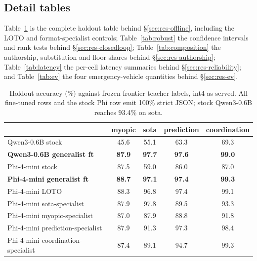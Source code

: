 
\subsection{Detail tables}\label{app:detail-tables}
Table~\ref{tab:offline-full} is the complete holdout table behind
\S\ref{sec:res-offline}, including the LOTO and format-specialist
controls; Table~\ref{tab:robust} the confidence intervals and rank tests
behind \S\ref{sec:res-closedloop}; Table~\ref{tab:composition} the
authorship, substitution and floor shares behind
\S\ref{sec:res-authorship}; Table~\ref{tab:latency} the per-cell latency
summaries behind \S\ref{sec:res-reliability}; and Table~\ref{tab:ev} the
four emergency-vehicle quantities behind \S\ref{sec:res-ev}.

\begin{table}[t]
\centering
\small
\begin{tabular}{lcccc}
\toprule
 & myopic & sota & prediction & coordination \\
\midrule
Qwen3-0.6B stock & 45.6 & 55.1 & 63.3 & 69.3 \\
\textbf{Qwen3-0.6B generalist ft} & \textbf{87.9} & \textbf{97.7} & \textbf{97.6} & \textbf{99.0} \\
Phi-4-mini stock & 87.5 & 59.0 & 86.0 & 87.0 \\
\textbf{Phi-4-mini generalist ft} & \textbf{88.7} & \textbf{97.1} & \textbf{97.4} & \textbf{99.3} \\
Phi-4-mini LOTO & 88.3 & 96.8 & 97.4 & 99.1 \\
Phi-4-mini sota-specialist & 87.9 & 97.8 & 89.5 & 93.3 \\
Phi-4-mini myopic-specialist & 87.0 & 87.9 & 88.8 & 91.8 \\
Phi-4-mini prediction-specialist & 87.9 & 91.3 & 97.3 & 98.4 \\
Phi-4-mini coordination-specialist & 87.4 & 89.1 & 94.7 & 99.3 \\
\bottomrule
\end{tabular}
\caption{Holdout accuracy (\%) against frozen frontier-teacher labels,
int4-as-served. All fine-tuned rows and the stock Phi row emit 100\% strict JSON; stock
Qwen3-0.6B reaches 93.4\% on sota.}
\label{tab:offline-full}
\end{table}


